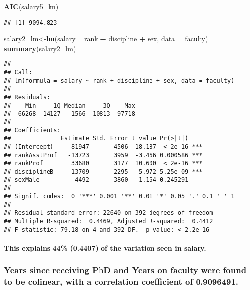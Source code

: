\documentclass[]{article}
\newenvironment{Shaded}{\begin{snugshade}}{\end{snugshade}}
\newcommand{\KeywordTok}[1]{\textcolor[rgb]{0.13,0.29,0.53}{\textbf{#1}}}
\newcommand{\DataTypeTok}[1]{\textcolor[rgb]{0.13,0.29,0.53}{#1}}
\newcommand{\StringTok}[1]{\textcolor[rgb]{0.31,0.60,0.02}{#1}}
\newcommand{\OperatorTok}[1]{\textcolor[rgb]{0.81,0.36,0.00}{\textbf{#1}}}
\newcommand{\NormalTok}[1]{#1}
\let\oldparagraph\paragraph
\renewcommand{\paragraph}[1]{\oldparagraph{#1}\mbox{}}
\begin{document}
\begin{Shaded}
\begin{Highlighting}[]
\KeywordTok{AIC}\NormalTok{(salary5_lm)}
\end{Highlighting}
\end{Shaded}

\begin{verbatim}
## [1] 9094.823
\end{verbatim}

\begin{Shaded}
\begin{Highlighting}[]
\NormalTok{salary2_lm<-}\KeywordTok{lm}\NormalTok{(salary }\OperatorTok{~}\StringTok{ }\NormalTok{rank }\OperatorTok{+}\StringTok{ }\NormalTok{discipline }\OperatorTok{+}\StringTok{ }\NormalTok{sex, }\DataTypeTok{data =}\NormalTok{ faculty)}
\KeywordTok{summary}\NormalTok{(salary2_lm)}
\end{Highlighting}
\end{Shaded}

\begin{verbatim}
## 
## Call:
## lm(formula = salary ~ rank + discipline + sex, data = faculty)
## 
## Residuals:
##    Min     1Q Median     3Q    Max 
## -66268 -14127  -1566  10813  97718 
## 
## Coefficients:
##              Estimate Std. Error t value Pr(>|t|)    
## (Intercept)     81947       4506  18.187  < 2e-16 ***
## rankAsstProf   -13723       3959  -3.466 0.000586 ***
## rankProf        33680       3177  10.600  < 2e-16 ***
## disciplineB     13709       2295   5.972 5.25e-09 ***
## sexMale          4492       3860   1.164 0.245291    
## ---
## Signif. codes:  0 '***' 0.001 '**' 0.01 '*' 0.05 '.' 0.1 ' ' 1
## 
## Residual standard error: 22640 on 392 degrees of freedom
## Multiple R-squared:  0.4469, Adjusted R-squared:  0.4412 
## F-statistic: 79.18 on 4 and 392 DF,  p-value: < 2.2e-16
\end{verbatim}

\paragraph{This explains 44\% (0.4407) of the variation seen in
salary.}\label{this-explains-44-0.4407-of-the-variation-seen-in-salary.}

\subsubsection{Years since receiving PhD and Years on faculty were found
to be colinear, with a correlation coefficient of
0.9096491.}\label{years-since-receiving-phd-and-years-on-faculty-were-found-to-be-colinear-with-a-correlation-coefficient-of-0.9096491.}
\end{document}
